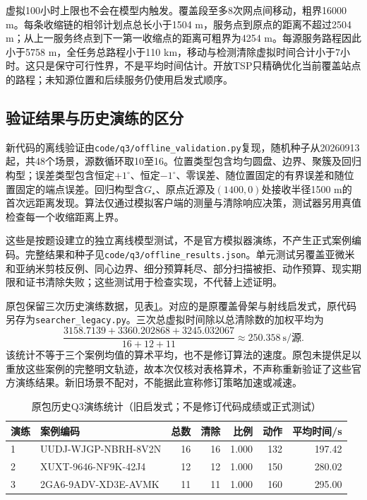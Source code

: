 虚拟100小时上限也不会在模型内触发。覆盖段至多8次网点间移动，粗界16000 m。每条收缩链的相邻计划点总长小于1504 m，服务点到原点的距离不超过2504 m；从上一服务终点到下一第一收缩点的距离可粗界为4254 m。每源服务路程因此小于5758 m，全任务总路程小于110 km，移动与检测清除虚拟时间合计小于7小时。这只是保守可行性界，不是平均时间估计。开放TSP只精确优化当前覆盖站点的路程；未知源位置和后续服务仍使用启发式顺序。

\subsection{验证结果与历史演练的区分}



新代码的离线验证由\texttt{code/q3/offline\_validation.py}复现，随机种子从20260913起，共48个场景，源数循环取10至16。位置类型包含均匀圆盘、边界、聚簇及回归构型；误差类型包含恒定$+1^\circ$、恒定$-1^\circ$、零误差、随位置固定的有界误差和随位置固定的端点误差。回归构型含$G_\star$、原点近源及$(1400,0)$处接收半径1500 m的首次远距离发现。算法仅通过模拟客户端的测量与清除响应决策，测试器另用真值检查每一个收缩距离上界。

这些是按题设建立的独立离线模型测试，不是官方模拟器演练，不产生正式案例编码。完整结果和种子见\texttt{code/q3/offline\_results.json}。单元测试另覆盖亚微米和亚纳米剪枝反例、同心边界、细分预算耗尽、部分扫描被拒、动作预算、现实期限和证书清除失败；这些测试用于检查实现，不代替上述证明。

原包保留三次历史演练数据，见表\ref{tab:q3reh}。对应的是原覆盖骨架与射线启发式，原代码另存为\texttt{searcher\_legacy.py}。三次总虚拟时间除以总清除数的加权平均为
\[
\frac{3158.7139+3360.202868+3245.032067}{16+12+11}
\approx250.358\ \text{s/源}.
\]
该统计不等于三个案例均值的算术平均，也不是修订算法的速度。原包未提供足以重放这些案例的完整明文轨迹，故本次仅核对表格算术，不声称重新验证了这些官方演练结果。新旧场景不配对，不能据此宣称修订策略加速或减速。

\begin{table}[htbp]
\centering\scriptsize
\caption{原包历史Q3演练统计（旧启发式；不是修订代码成绩或正式测试）}\label{tab:q3reh}
\begin{tabular}{llrrrrr}\toprule
演练 & 案例编码 & 总数 & 清除 & 比例 & 动作 & 平均时间/s\\\midrule
1 & UUDJ-WJGP-NBRH-8V2N & 16 & 16 & 1.000 & 132 & 197.42\\
2 & XUXT-9646-NF9K-42J4 & 12 & 12 & 1.000 & 150 & 280.02\\
3 & 2GA6-9ADV-XD3E-AVMK & 11 & 11 & 1.000 & 160 & 295.00\\\bottomrule
\end{tabular}
\end{table}

